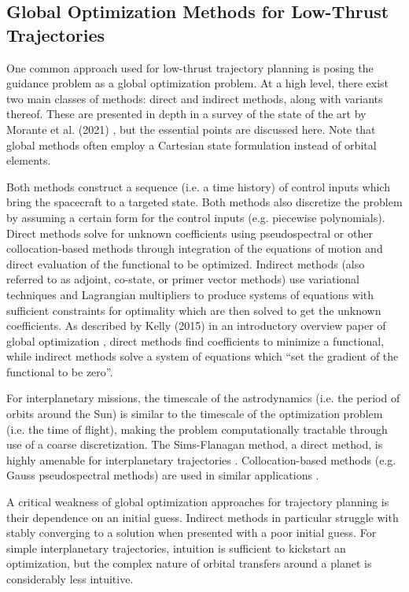 \subsection{Global Optimization Methods for Low-Thrust Trajectories}

One common approach used for low-thrust trajectory planning is posing the guidance problem as a global optimization problem. At a high level, there exist two main classes of methods: direct and indirect methods, along with variants thereof. These are presented in depth in a survey of the state of the art by Morante et al. (2021) \cite{morante2021survey}, but the essential points are discussed here. Note that global methods often employ a Cartesian state formulation instead of orbital elements.

Both methods construct a sequence (i.e. a time history) of control inputs which bring the spacecraft to a targeted state. Both methods also discretize the problem by assuming a certain form for the control inputs (e.g. piecewise polynomials). Direct methods solve for unknown coefficients using pseudospectral or other collocation-based methods through integration of the equations of motion and direct evaluation of the functional to be optimized. Indirect methods (also referred to as adjoint, co-state, or primer vector methods) use variational techniques and Lagrangian multipliers to produce systems of equations with sufficient constraints for optimality which are then solved to get the unknown coefficients. As described by Kelly (2015) in an introductory overview paper of global optimization \cite{kelly2015transcription}, direct methods find coefficients to minimize a functional, while indirect methods solve a system of equations which ``set the gradient of the functional to be zero''.

For interplanetary missions, the timescale of the astrodynamics (i.e. the period of orbits around the Sun) is similar to the timescale of the optimization problem (i.e. the time of flight), making the problem computationally tractable through use of a coarse discretization. The Sims-Flanagan method, a direct method, is highly amenable for interplanetary trajectories \cite{sims1997preliminary, yam2011low}. Collocation-based methods (e.g. Gauss pseudospectral methods) are used in similar applications \cite{fahroo2002direct, narayanaswamy2020comparison}.

A critical weakness of global optimization approaches for trajectory planning is their dependence on an initial guess. Indirect methods in particular struggle with stably converging to a solution when presented with a poor initial guess. For simple interplanetary trajectories, intuition is sufficient to kickstart an optimization, but the complex nature of orbital transfers around a planet is considerably less intuitive.

